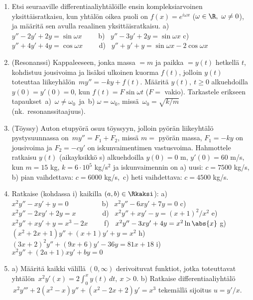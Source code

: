 \begin{enumerate}
\item
Etsi seuraaville differentiaaliyhtälöille ensin kompleksiarvoinen yksittäisratkaisu, kun
yhtälön oikea puoli on $f(x)=e^{i\omega x}$ ($\omega\in\R,\ \omega \neq 0$), ja määritä sen
avulla reaalinen yksittäisratkaisu. \vspace{1mm}\newline
a) \ $y''-2y'+2y=\sin\omega x \qquad$ 
b) \ $y''-3y'+2y=\sin\omega x$ \newline
c) \ $y''+4y'+4y=\cos\omega x \qquad$
d) \ $y''+y'+y=\sin\omega x-2\cos\omega x$

\item {}
(Resonanssi) Kappaleeseen, jonka massa $=m$ ja paikka $=y(t)$ hetkellä $t$, kohdistuu
jousivoima ja lisäksi ulkoinen kuorma $f(t)$, jolloin $y(t)$ toteuttaa liikeyhälön
$\,my''=-ky+f(t)$. Määritä $y(t),\ t \ge 0$ alkuehdoilla $y(0)=y'(0)=0$, kun
$f(t)=F\sin\omega t$ ($F=$ vakio). Tarkastele erikseen tapaukset \,a) $\,\omega\neq\omega_0\,$
ja \,b) $\omega=\omega_0$, missä $\,\omega_0=\sqrt{k/m}\,$ (nk.\ resonanssitaajuus).

\item {}
(Töyssy) Auton etupyörä osuu töyssyyn, jolloin pyörän liikeyhtälö pystysuunnassa on
$\,my''=F_1+F_2$, missä $m=$ pyörän massa, $F_1=-ky$ on jousivoima ja $F_2=-cy'$ on
iskunvaimentimen vastusvoima. Hahmottele ratkaisu $y(t)$ (aikayksikkö s) alkuehdoilla
$y(0)=0$ m, $y'(0)=60$ m/s, kun $m=15$ kg, $k=6 \cdot 10^5$ kg/s$^2$ ja iskunvaimennin on
a) uusi: $c=7500$ kg/s, b) pian vaihdettava: $c=6000$ kg/s,\, c) heti vaihdettava:
$c=4500$ kg/s.

\item
Ratkaise (kohdassa i) kaikilla $(a,b)\in\Rkaksi$): \vspace{1mm}\newline
a) \ $x^2y''-xy'+y=0 \qquad\qquad\ \ $
b) \ $x^2y''-6xy'+7y=0$ \newline
c) \ $x^2y''-2xy'+2y=x \qquad\quad\ \ $
d) \ $x^2y''+xy'-y=(x+1)^2/x^2$ \newline
e) \ $x^2y''+xy'+y=x^3-2x \qquad$
f) \ $x^2y''-3xy'+4y=x^2\ln\abs{x}$ \newline
g) \ $(x^2+2x+1)y''+(x+1)y'+y=x^2$ \newline
h) \ $(3x+2)^2y''+(9x+6)y'-36y=81x+18$ \newline
i) \,\ $x^2y''+(2a+1)xy'+by=0$

\item
a) Määritä kaikki välillä $(0,\infty)$ derivoituvat funktiot, jotka toteuttavat yhtälön
$\,x^2y'(x)=2\int_0^x y(t)\,dt,\ x>0$. \newline
b) Ratkaise differentiaaliyhtälö $\,x^2y'''+2(x^2-x)y''+(x^2-2x+2)y'=x^3$ tekemällä sijoitus
$u=y'/x$.


\end{enumerate}
